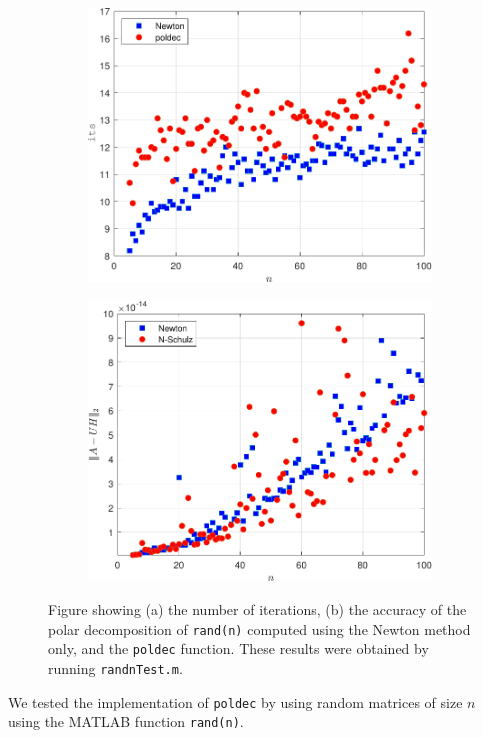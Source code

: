 \documentclass[10pt, A4paper]{article}
\begin{document}
\begin{figure}[t]
	\centering
	\begin{subfigure}{0.5\textwidth}
		\centering
		\includegraphics[width=.8\linewidth]{randnIts.pdf}
		\caption{\label{fig:randnIts}}
	\end{subfigure}%
	\begin{subfigure}{0.5\textwidth}
		\centering
		\includegraphics[width=.8\linewidth]{randnAccuracy.pdf}
		\caption{\label{fig:randnAccuracy}}
	\end{subfigure}
	\caption{
	Figure showing (a) the number of iterations,
	(b) the accuracy of the polar decomposition of 
	\texttt{rand(n)} computed using the Newton method only, and the 
	\texttt{poldec} function. These results were obtained by running 
	\texttt{randnTest.m}.
	\label{fig:randn}}
\end{figure}
We tested the implementation of \texttt{poldec} by using random 
matrices of size $n$ using the MATLAB function \texttt{rand(n)}.
\end{document}
